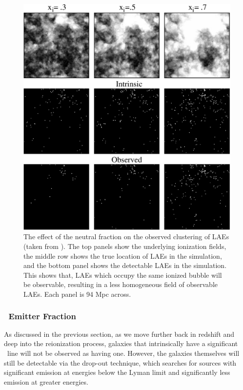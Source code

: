 \begin{figure}[h]
  \centering
  \includegraphics[width=13cm]{McQuinnLAEClusteringLarge.eps}
  \caption{The effect of the neutral fraction on the observed clustering of LAEs (taken from \citealt{McQuinn:2007dy}). The top panels show the underlying ionization fields, the middle row shows the true location of LAEs in the simulation, and the bottom panel shows the detectable LAEs in the simulation. This shows that, LAEs which occupy the same ionized bubble will be observable, resulting in a less homogeneous field of observable LAEs. Each panel is 94 Mpc across. }
  \label{fig:McQuinnLAEClustering}
\end{figure}


\subsubsection{\lya\ Emitter Fraction}

As discussed in the previous section, as we move further back in redshift and deep into the reionization process, galaxies that intrinsically have a significant \lya\ line will not be observed as having one. However, the galaxies themselves will still be detectable via the drop-out technique, which searches for sources with significant emission at energies below the Lyman limit and significantly less emission at greater energies. 


